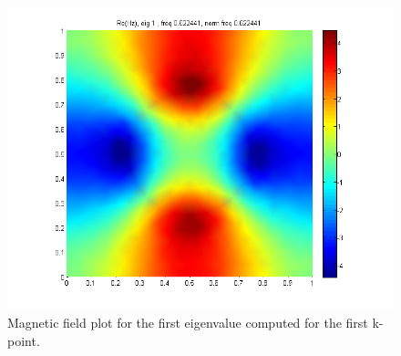 \documentclass[11pt,a4paper,oneside]{article}
\begin{document}
\begin{figure}
\begin{center}
\includegraphics[width=\textwidth]{mode.png}
\caption{\label{fig:mode} Magnetic field plot for the first eigenvalue computed for the first k-point.}
\end{center}
\end{figure}
\end{document}
